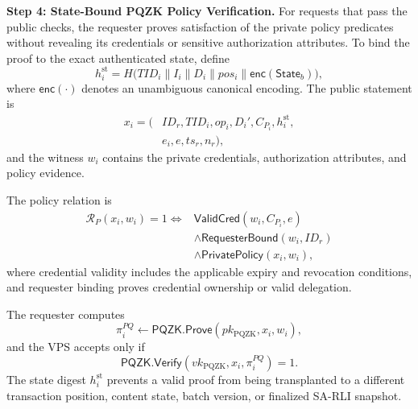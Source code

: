 \documentclass[lettersize,journal]{IEEEtran}
\begin{document}
\medskip
\noindent\textbf{Step 4: State-Bound PQZK Policy Verification.}
For requests that pass the public checks, the requester proves
satisfaction of the private policy predicates without revealing its
credentials or sensitive authorization attributes. To bind the proof
to the exact authenticated state, define
\begin{equation}
h_i^{\mathrm{st}}
=
H\big(
TID_i\parallel I_i\parallel D_i\parallel pos_i
\parallel \mathsf{enc}(\mathsf{State}_b)
\big),
\end{equation}
where $\mathsf{enc}(\cdot)$ denotes an unambiguous canonical encoding.
The public statement is
\begin{equation}
\begin{aligned}
x_i=\big(&ID_r,TID_i,op_i,D_i',
C_{P_i},h_i^{\mathrm{st}},\\
& e_i,e,ts_r,n_r\big),
\end{aligned}
\end{equation}
and the witness $w_i$ contains the private credentials,
authorization attributes, and policy evidence.

The policy relation is
\begin{equation}
\begin{aligned}
\mathcal{R}_{P}(x_i,w_i)=1
\iff{}&
\mathsf{ValidCred}(w_i,C_{P_i},e)\\
&\land
\mathsf{RequesterBound}(w_i,ID_r)\\
&\land
\mathsf{PrivatePolicy}(x_i,w_i),
\end{aligned}
\end{equation}
where credential validity includes the applicable expiry and revocation
conditions, and requester binding proves credential ownership or valid
delegation.

The requester computes
\begin{equation}
\pi_i^{PQ}\leftarrow
\mathsf{PQZK.Prove}
(pk_{\mathrm{PQZK}},x_i,w_i),
\end{equation}
and the VPS accepts only if
\begin{equation}
\mathsf{PQZK.Verify}
(vk_{\mathrm{PQZK}},x_i,\pi_i^{PQ})=1.
\end{equation}
The state digest $h_i^{\mathrm{st}}$ prevents a valid proof from being
transplanted to a different transaction position, content state, batch
version, or finalized SA-RLI snapshot.
\end{document}
